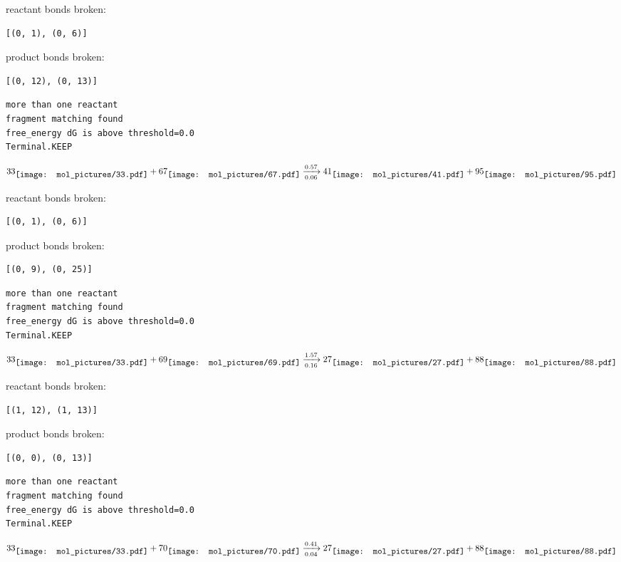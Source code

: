 \documentclass{article}
\begin{document}
reactant bonds broken:\begin{verbatim}
[(0, 1), (0, 6)]
\end{verbatim}
product bonds broken:\begin{verbatim}
[(0, 12), (0, 13)]
\end{verbatim}




\vspace{1cm}
\begin{verbatim}
more than one reactant
fragment matching found
free_energy dG is above threshold=0.0
Terminal.KEEP
\end{verbatim}
$$
33
\raisebox{-.5\height}{\texttt{[image: mol\_pictures/33.pdf]}}
+
67
\raisebox{-.5\height}{\texttt{[image: mol\_pictures/67.pdf]}}
\xrightarrow[0.06]{0.57}
41
\raisebox{-.5\height}{\texttt{[image: mol\_pictures/41.pdf]}}
+
95
\raisebox{-.5\height}{\texttt{[image: mol\_pictures/95.pdf]}}
$$


reactant bonds broken:\begin{verbatim}
[(0, 1), (0, 6)]
\end{verbatim}
product bonds broken:\begin{verbatim}
[(0, 9), (0, 25)]
\end{verbatim}




\vspace{1cm}
\begin{verbatim}
more than one reactant
fragment matching found
free_energy dG is above threshold=0.0
Terminal.KEEP
\end{verbatim}
$$
33
\raisebox{-.5\height}{\texttt{[image: mol\_pictures/33.pdf]}}
+
69
\raisebox{-.5\height}{\texttt{[image: mol\_pictures/69.pdf]}}
\xrightarrow[0.16]{1.57}
27
\raisebox{-.5\height}{\texttt{[image: mol\_pictures/27.pdf]}}
+
88
\raisebox{-.5\height}{\texttt{[image: mol\_pictures/88.pdf]}}
$$


reactant bonds broken:\begin{verbatim}
[(1, 12), (1, 13)]
\end{verbatim}
product bonds broken:\begin{verbatim}
[(0, 0), (0, 13)]
\end{verbatim}




\vspace{1cm}
\begin{verbatim}
more than one reactant
fragment matching found
free_energy dG is above threshold=0.0
Terminal.KEEP
\end{verbatim}
$$
33
\raisebox{-.5\height}{\texttt{[image: mol\_pictures/33.pdf]}}
+
70
\raisebox{-.5\height}{\texttt{[image: mol\_pictures/70.pdf]}}
\xrightarrow[0.04]{0.41}
27
\raisebox{-.5\height}{\texttt{[image: mol\_pictures/27.pdf]}}
+
88
\raisebox{-.5\height}{\texttt{[image: mol\_pictures/88.pdf]}}
$$
\end{document}
